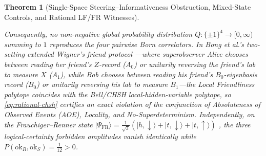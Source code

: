 \documentclass[11pt,a4paper]{article}
\newtheorem{theorem}{Theorem}
\theoremstyle{definition}
\theoremstyle{remark}
\newcommand{\1}{\mathbf{1}}
\begin{document}
\begin{theorem}[Single-Space Steering--Informativeness Obstruction, Mixed-State Controls, and Rational LF/FR Witnesses]
\begin{enumerate}
  Consequently, no non-negative global probability distribution $Q:\{\pm 1\}^4\to[0,\infty)$ summing to $1$ reproduces the four pairwise Born correlators. In Bong et al.'s two-setting extended Wigner's friend protocol \cite{Bong2020}---where superobserver Alice chooses between reading her friend's $Z$-record ($A_0$) or unitarily reversing the friend's lab to measure $X$ ($A_1$), while Bob chooses between reading his friend's $B_0$-eigenbasis record ($B_0$) or unitarily reversing his lab to measure $B_1$---the Local Friendliness polytope coincides with the Bell/CHSH local-hidden-variable polytope, so \eqref{eq:rational-chsh} certifies an exact violation of the conjunction of Absoluteness of Observed Events (AOE), Locality, and No-Superdeterminism. Independently, on the Frauchiger--Renner state $|\Psi_{\mathrm{FR}}\rangle=\frac{1}{\sqrt{3}}(|h,\downarrow\rangle+|t,\downarrow\rangle+|t,\uparrow\rangle)$ \cite{FrauchigerRenner2018}, the three logical-certainty forbidden amplitudes vanish identically while $P(\mathrm{ok}_R,\mathrm{ok}_S)=\frac{1}{12}>0$.
\end{enumerate}
\end{theorem}
\end{document}
